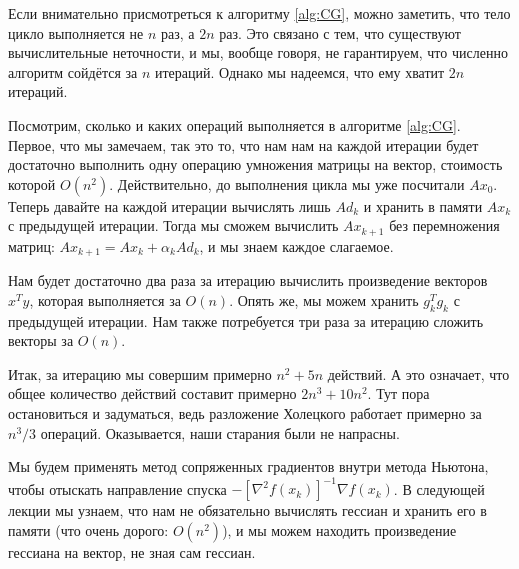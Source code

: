 \documentclass[a4paper, 12pt]{article}
\begin{document}
Если внимательно присмотреться к алгоритму \ref{alg:CG}, можно заметить, что тело цикло выполняется не $n$ раз, а $2n$ раз. Это связано с тем, что существуют вычислительные неточности, и мы, вообще говоря, не гарантируем, что численно алгоритм сойдётся за $n$ итераций. Однако мы надеемся, что ему хватит $2n$ итераций.

Посмотрим, сколько и каких операций выполняется в алгоритме \ref{alg:CG}. Первое, что мы замечаем, так это то, что нам нам на каждой итерации будет достаточно выполнить одну операцию умножения матрицы на вектор, стоимость которой $O(n^2)$. Действительно, до выполнения цикла мы уже посчитали $Ax_0$. Теперь давайте на каждой итерации вычислять лишь $Ad_k$ и хранить в памяти $Ax_k$ с предыдущей итерации. Тогда мы сможем вычислить $Ax_{k+1}$ без перемножения матриц: $Ax_{k+1} = Ax_k + \alpha_kAd_k$, и мы знаем каждое слагаемое.

Нам будет достаточно два раза за итерацию вычислить произведение векторов $x^Ty$, которая выполняется за $O(n)$. Опять же, мы можем хранить $g_k^Tg_k$ с предыдущей итерации. Нам также потребуется три раза за итерацию сложить векторы за $O(n)$.

Итак, за итерацию мы совершим примерно $n^2 + 5n$ действий. А это означает, что общее количество действий составит примерно $2n^3 + 10n^2$. Тут пора остановиться и задуматься, ведь разложение Холецкого работает примерно за $n^3/3$ операций. Оказывается, наши старания были не напрасны.

Мы будем применять метод сопряженных градиентов внутри метода Ньютона, чтобы отыскать направление спуска $-[\nabla^2f(x_k)]^{-1}\nabla f(x_k)$. В следующей лекции мы узнаем, что нам не обязательно вычислять гессиан и хранить его в памяти (что очень дорого: $O(n^2)$), и мы можем находить произведение гессиана на вектор, не зная сам гессиан.
\end{document}
